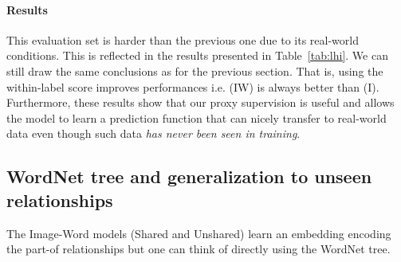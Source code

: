 \paragraph{Results} This evaluation set is harder than the previous
one due to its real-world conditions. This is reflected in the results
presented in Table~\ref{tab:lhi}.
%
We can still draw the same conclusions as for the previous section.
That is, using the within-label score improves performances i.e. (IW)
is always better than (I).
%
Furthermore, these results show that our proxy supervision is
useful and allows the model to learn a prediction function that
can nicely transfer to real-world data even though such data {\it has
  never been seen in training}.
%




\begin{table}[t!]
\begin{center}
\caption{\textbf{Summary of Results on LHI data}\label{tab:lhi}}
\end{center}
\end{table}

\subsection{WordNet tree and generalization to unseen relationships}

The Image-Word models (Shared and Unshared) learn an embedding encoding the
part-of relationships but one can think of directly using the WordNet tree.


